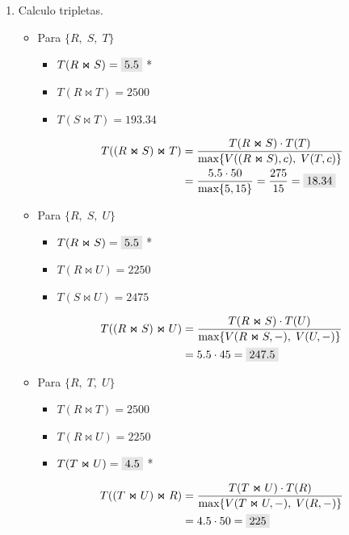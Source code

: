 \documentclass{templateNote}
\newcommand{\newparagraph}{\par\vspace{\baselineskip}\noindent}
\begin{document}
\begin{enumerate}
\begin{enumerate}[label=\arabic*)]
        \item Calculo tripletas.
        \begin{itemize}
            \item Para $\{R, \; S, \; T\}$
            \begin{itemize}
                \item $T(R \Join S) = \colorbox{gray!20}{5.5}$ *
                \item $T(R \Join T) = 2500$
                \item $T(S \Join T) = 193.34$
            \end{itemize}
            \begin{align*}
                T((R \Join S) \Join T) &= \displaystyle\frac{T(R \Join S) \cdot T(T)}{\text{max}\{V((R \Join S), c), \; V(T,c)\}} \\
                &= \frac{5.5 \cdot 50}{\text{max}\{5, 15\}} = \frac{275}{15} = \colorbox{gray!20}{18.34}
            \end{align*}
            \newparagraph

            \newpage
            \item Para $\{R, \; S, \; U\}$
            \begin{itemize}
                \item $T(R \Join S) = \colorbox{gray!20}{5.5}$ *
                \item $T(R \Join U) = 2250$
                \item $T(S \Join U) = 2475$
            \end{itemize}
            \begin{align*}
                T((R \Join S) \Join U) &= \displaystyle\frac{T(R \Join S) \cdot T(U)}{\text{max}\{V(R\Join S,-), \; V(U,-)\}} \\
                &= 5.5 \cdot 45 = \colorbox{gray!20}{247.5}
            \end{align*}
            \newparagraph

            \item Para $\{R, \; T, \; U\}$
            \begin{itemize}
                \item $T(R \Join T) = 2500$
                \item $T(R \Join U) = 2250$
                \item $T(T \Join U) = \colorbox{gray!20}{4.5}$ *
            \end{itemize}
            \begin{align*}
                T((T \Join U) \Join R) &= \displaystyle\frac{T(T \Join U) \cdot T(R)}{\text{max}\{V(T \Join U,-), \; V(R,-)\}} \\
                &= 4.5 \cdot 50 = \colorbox{gray!20}{225}
            \end{align*}
            \newparagraph


\end{itemize}
\end{enumerate}
\end{enumerate}
\end{document}
